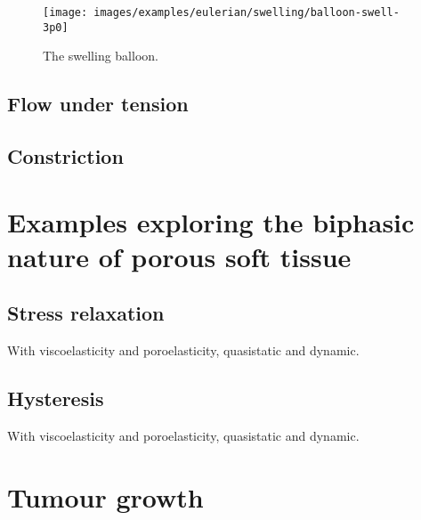 \begin{figure}
\centering
{\texttt{[image: images/examples/eulerian/swelling/balloon-swell-3p0]}}
\caption{The swelling balloon.} 
\label{swelling-balloon-image-5}
\end{figure}

\subsection{Flow under tension}
\label{tenson-flow}

\subsection{Constriction}
\label{constriction-2}

\section{Examples exploring the biphasic nature of porous soft tissue}
\label{biphasic-examples-2}

\subsection{Stress relaxation}
\label{stress-relaxation}
With viscoelasticity and poroelasticity, quasistatic and dynamic.

\subsection{Hysteresis}
\label{hysteresis}
With viscoelasticity and poroelasticity, quasistatic and dynamic.

\section{Tumour growth}
\label{tumor-growth}

%

